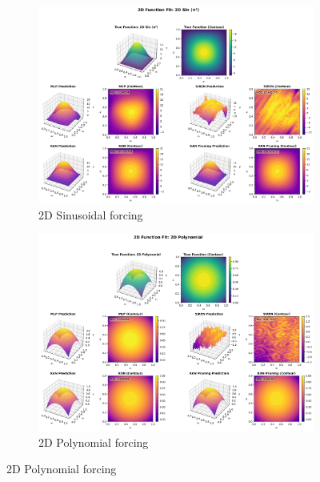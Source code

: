 \documentclass[11pt,a4paper]{article}
\begin{document}
\begin{figure}[htbp]
\centering
\begin{subfigure}{0.48\textwidth}
\includegraphics[width=\textwidth]{../section1/visualization/heatmap_2d_dataset_0_2D_Sin_(π²)_20251023_031942.png}
\caption{2D Sinusoidal forcing}
\end{subfigure}
\hfill
\begin{subfigure}{0.48\textwidth}
\includegraphics[width=\textwidth]{../section1/visualization/heatmap_2d_dataset_1_2D_Polynomial_20251023_031942.png}
\caption{2D Polynomial forcing}
\end{subfigure}

\vspace{0.3cm}


\end{figure}
\end{document}
